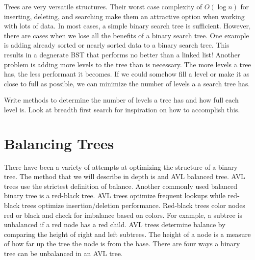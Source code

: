 \label{lab:btrees}

Trees are very versatile structures.  
Their worst case complexity of $O(\log n)$ for inserting, deleting, and searching make them an attractive option when working with lots of data.
In most cases, a simple binary search tree is sufficient.
However, there are cases when we lose all the benefits of a binary search tree.
One example is adding already sorted or nearly sorted data to a binary search tree.
This results in a degnerate BST that performs no better than a linked list!
Another problem is adding more levels to the tree than is necessary.
The more levels a tree has, the less performant it becomes.  If we could somehow fill a level or make it as close to full as possible, we can minimize the number of levels a a search tree has.

\begin{problem}
Write methods to determine the number of levels a tree has and how full each level is.  Look at breadth first search for inspiration on how to accomplish this.
\end{problem}

\section*{Balancing Trees}
There have been a variety of attempts at optimizing the structure of a binary tree.
The method that we will describe in depth is and AVL balanced tree.
AVL trees use the strictest definition of balance.
Another commonly used balanced binary tree is a red-black tree.  AVL trees optimize frequent lookups while red-black trees optimize insertion/deletion performance.
Red-black trees color nodes red or black and check for imbalance based on colors.  For example, a subtree is unbalanced if a red node has a red child.
AVL trees determine balance by comparing the height of right and  left subtrees.
The height of a node is a measure of how far up the tree the node is from the base.
There are four ways a binary tree can be unbalanced in an AVL tree.

